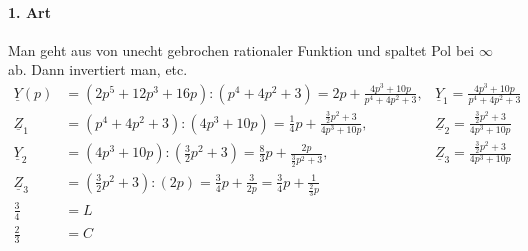\paragraph{1. Art}
Man geht aus von unecht gebrochen rationaler Funktion und
spaltet Pol bei $\infty$ ab. Dann invertiert man, etc.
\begin{align}
	\underline{Y}(p)&=\left(2p^5+12p^3+16p\right):\left(p^4+4p^2+3\right)=2p+\frac{4p^3+10p}{p^4+4p^2+3},
	&\underline{Y}_1=\frac{4p^3+10p}{p^4+4p^2+3}\nonumber\\
	\underline{Z}_1&=\left(p^4+4p^2+3\right):\left(4p^3+10p\right)=\frac{1}{4}p+\frac{\frac{3}{2}p^2+3}{4p^3+10p},
	&\underline{Z}_2=\frac{\frac{3}{2}p^2+3}{4p^3+10p}\nonumber\\
	\underline{Y}_2&=\left(4p^3+10p\right):\left(\frac{3}{2}p^2+3\right)=\frac{8}{3}p+\frac{2p}{\frac{3}{2}p^2+3},
	&\underline{Z}_3=\frac{\frac{3}{2}p^2+3}{4p^3+10p}\nonumber\\
	\underline{Z}_3&=\left(\frac{3}{2}p^2+3\right):\left(2p\right)=\frac{3}{4}p+\frac{3}{2p}=\frac{3}{4}p+\frac{1}{\frac{2}{3}p}\nonumber\\
	\frac{3}{4}&=L\nonumber\\ \frac{2}{3}&=C\nonumber
\end{align}
